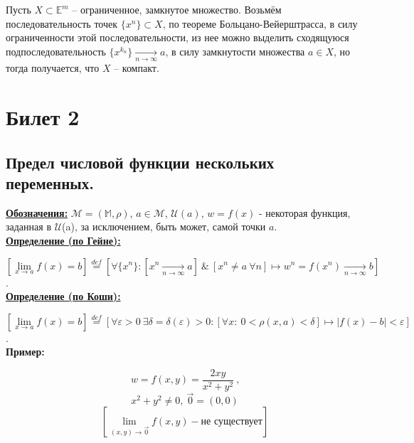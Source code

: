 \documentclass[a4paper,12pt]{article} %
\begin{document}
Пусть $X \subset \mathbb{E}^m$ -- ограниченное, замкнутое множество. Возьмём последовательность точек $\{x^n \} \subset X$, по теореме Больцано-Вейерштрасса, в силу ограниченности этой последовательности, из нее можно выделить сходящуюся подпоследовательность $\{x^{k_n} \} \xrightarrow[n \to \infty]{} a$, в силу замкнутости множества $a \in X$, но тогда получается, что $X$ -- компакт.




\newpage
\section{Билет 2}

\subsection{Предел числовой функции нескольких переменных.}

\underline{\textbf{Обозначения:}}
$\mathscr{M} = (\mathbb{M}, \rho)$, $a \in \mathscr{M}$, $\mathscr{U}(a)$,
$w = f(x)$ - некоторая функция, заданная в $\mathscr{U}$(a), за исключением, быть может, самой точки $a$.\\

\underline{\textbf{Определение (по Гейне):}}

	$[\lim\limits_{x \to a}f(x) = b] \stackrel{def}{=} \left[ \forall \{x^n\}: 
	[x^n \xrightarrow[n \rightarrow \infty]{} a] ~ \& ~ [x^n \neq a ~ \forall n] \mapsto 
	w^n = f(x^n) \xrightarrow[n \rightarrow \infty]{} b\right]$. \\
	
\underline{\textbf{Определение (по Коши):}}

	$[\lim\limits_{x \to a}f(x) = b] \stackrel{def}{=} \left[\forall \varepsilon > 0 ~ 
	\exists\delta = \delta(\varepsilon) > 0: 
	[\forall x: ~ 0 < \rho (x, a) < \delta] \mapsto |f(x) - b| < \varepsilon\right]$. \\

\textbf{Пример:}
	
	$$w = f(x, y) = \frac{2xy}{x^2 + y^2} ~ \text{,}$$
	$$x^2 + y^2 \neq 0, ~ \vec{0} = (0, 0)$$
	$$[\lim\limits_{(x,y) \to \vec{0}}f(x, y) - \text{не существует}]$$
\end{document}
